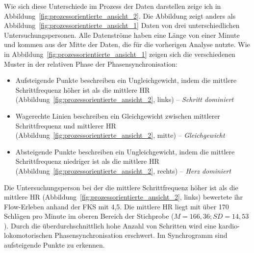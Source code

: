 Wie sich diese Unterschiede im Prozess der Daten darstellen zeige ich in Abbildung~\ref{fig:prozessorientierte_ansicht_2}. Die Abbildung zeigt anders als Abbildung~\ref{fig:prozessorientierte_ansicht_1} Daten von drei unterschiedlichen Untersuchungspersonen. Alle Datenströme haben eine Länge von einer Minute und kommen aus der Mitte der Daten, die für die vorherigen Analyse nutzte. Wie in Abbildung~\ref{fig:prozessorientierte_ansicht_1} zeigen sich die verschiedenen Muster in der relativen Phase der Phasensynchronisation: 
\begin{itemize}
	
	\item Aufsteigende Punkte beschreiben ein Ungleichgewicht, indem die mittlere Schrittfrequenz höher ist als die mittlere HR (Abbildung~\ref{fig:prozessorientierte_ansicht_2}, links) -- \emph{Schritt dominiert}
	
	\item Wagerechte Linien beschreiben ein Gleichgewicht zwischen mittlerer Schrittfrequenz und mittlerer HR (Abbildung~\ref{fig:prozessorientierte_ansicht_2}, mitte) -- \emph{Gleichgewicht}
	
	\item Absteigende Punkte beschreiben ein Ungleichgewicht, indem die mittlere Schrittfrequenz niedriger ist als die mittlere HR (Abbildung~\ref{fig:prozessorientierte_ansicht_2}, rechts) -- \emph{Herz dominiert} 
\end{itemize}

Die Untersuchungsperson bei der die mittlere Schrittfrequenz höher ist als die mittlere HR (Abbildung~\ref{fig:prozessorientierte_ansicht_2}, links) bewertete ihr Flow-Erleben anhand der \ac{FKS} mit 4,5. Die mittlere HR liegt mit über 170 Schlägen pro Minute im oberen Bereich der Stichprobe ($M = 166{,}36; SD = 14{,}53$). Durch die überdurchschnittlich hohe Anzahl von Schritten wird eine kardio-lokomotorischen Phasensynchronisation erschwert. Im Synchrogramm sind aufsteigende Punkte zu erkennen.
\begin{sidewaysfigure}
	 \caption[Beispielhafte Prozessdarstellung von mehreren Untersuchungspersonen.]{Beispielhafte Prozessdarstellung: Eine Minute Daten einer Untersuchungsperson der Gruppe Schritt dominiert (links), einer Untersuchungsperson Geleichgewicht (mitte) und einer Untersuchungsperson der Gruppe Herz dominert (rechts). \emph{Anmerkung}: Rel. Phase = Relative Phase.} \label{fig:prozessorientierte_ansicht_2} 
\end{sidewaysfigure}

